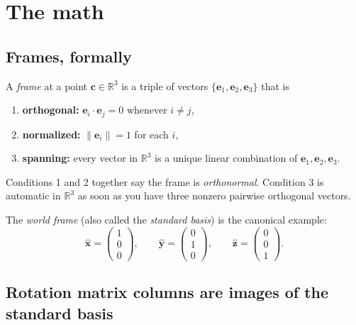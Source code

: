 \documentclass{article}
\begin{document}
\section{The math}

\subsection{Frames, formally}

A \emph{frame} at a point $\mathbf{c} \in \mathbb{R}^3$ is a triple of vectors
$\{\mathbf{e}_1, \mathbf{e}_2, \mathbf{e}_3\}$ that is

\begin{enumerate}
    \item \textbf{orthogonal:} $\mathbf{e}_i \cdot \mathbf{e}_j = 0$ whenever
          $i \neq j$,
    \item \textbf{normalized:} $\|\mathbf{e}_i\| = 1$ for each $i$,
    \item \textbf{spanning:} every vector in $\mathbb{R}^3$ is a unique linear
          combination of $\mathbf{e}_1, \mathbf{e}_2, \mathbf{e}_3$.
\end{enumerate}

Conditions 1 and 2 together say the frame is \emph{orthonormal}. Condition 3
is automatic in $\mathbb{R}^3$ as soon as you have three nonzero pairwise
orthogonal vectors.

The \emph{world frame} (also called the \emph{standard basis}) is the
canonical example:
\[
    \hat{\mathbf{x}} = \begin{pmatrix} 1 \\ 0 \\ 0 \end{pmatrix},
    \qquad
    \hat{\mathbf{y}} = \begin{pmatrix} 0 \\ 1 \\ 0 \end{pmatrix},
    \qquad
    \hat{\mathbf{z}} = \begin{pmatrix} 0 \\ 0 \\ 1 \end{pmatrix}.
\]

\subsection{Rotation matrix columns are images of the standard basis}
\end{document}

